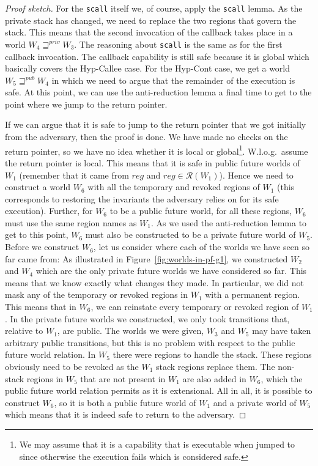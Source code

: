 \documentclass[format=acmsmall, review=true, screen=true]{acmart}
\renewcommand{\figurename}{Figure}
\newcommand{\var}[1]{\mathit{#1}}
\newcommand{\reg}{\var{reg}}
\newcommand{\futurewk}{\mathbin{\sqsupseteq}^{\var{pub}}}
\newcommand{\futurestr}{\mathbin{\sqsupseteq}^{\var{priv}}}
\newcommand{\asmType}{\plaindom{AsmType}}
\newcommand{\plaindom}[1]{\mathrm{#1}}
\newcommand{\intr}[2]{\mathcal{#1}}
\newcommand{\regintr}[1]{\intr{R}{#1}}
\newcommand{\stdrr}{\regintr{\asmType}}
\newenvironment{toplas}{}{}
\begin{document}
\begin{toplas}
\begin{proof}[Proof sketch]
  For the \texttt{scall} itself we, of course, apply the \texttt{scall} lemma.
  As the private stack has changed, we need to replace the two regions that govern the stack.
  This means that the second invocation of the callback takes place in a world $W_4 \futurestr W_3$.
  The reasoning about \texttt{scall} is the same as for the first callback invocation.
  The callback capability is still safe because it is global which basically covers the Hyp-Callee case.
  For the Hyp-Cont case, we get a world $W_5 \futurewk W_4$ in which we need to argue that the remainder of the execution is safe.
  At this point, we can use the anti-reduction lemma a final time to get to the point where we jump to the return pointer.
  
  If we can argue that it is safe to jump to the return pointer that we got initially from the adversary, then the proof is done.
  We have made no checks on the return pointer, so we have no idea whether it is local or global\footnote{We may assume that it is a capability that is executable when jumped to since otherwise the execution fails which is considered safe.}.
  W.l.o.g.\ assume the return pointer is local.
  This means that it is safe in public future worlds of $W_1$ (remember that it came from $\reg$ and $\reg \in \stdrr(W_1)$).
  Hence we need to construct a world $W_6$ with all the temporary and revoked regions of $W_1$ (this corresponds to restoring the invariants the adversary relies on for its safe execution).
  Further, for $W_6$ to be a public future world, for all these regions, $W_6$ must use the same region names as $W_1$. 
  As we used the anti-reduction lemma to get to this point, $W_6$ must also be constructed to be a private future world of $W_5$.
  Before we construct $W_6$, let us consider where each of the worlds we have seen so far came from: As illustrated in \figurename~\ref{fig:worlds-in-pf-g1}, we constructed $W_2$ and $W_4$ which are the only private future worlds we have considered so far.
  This means that we know exactly what changes they made.
  In particular, we did not mask any of the temporary or revoked regions in $W_1$ with a permanent region.
  This means that in $W_6$, we can reinstate every temporary or revoked region of $W_1$.
  In the private future worlds we constructed, we only took transitions that, relative to $W_1$, are public.
  The worlds we were given, $W_3$ and $W_5$ may have taken arbitrary public transitions, but this is no problem with respect to the public future world relation.
  In $W_5$ there were regions to handle the stack.
  These regions obviously need to be revoked as the $W_1$ stack regions replace them.
  The non-stack regions in $W_5$ that are not present in $W_1$ are also added in $W_6$, which the public future world relation permits as it is extensional.
  All in all, it is possible to construct $W_6$, so it is both a public future world of $W_1$ and a private world of $W_5$ which means that it is indeed safe to return to the adversary.


\end{proof}
\end{toplas}
\end{document}
